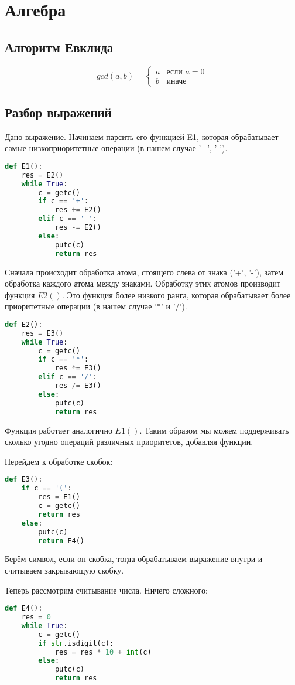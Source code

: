 \chapter{Алгебра}
\section{Алгоритм Евклида}
\[
	gcd(a, b) = 
		\begin{cases}
			a &\text{если } a = 0 \\
			b & \text{иначе}
		\end{cases}
\]

\section{Разбор выражений}
Дано выражение. Начинаем парсить его функцией E1, которая обрабатывает самые низкоприоритетные операции (в нашем случае '+', '-').
\begin{lstlisting}[language=Python]
def E1():
	res = E2()
	while True:
		c = getc()
		if c == '+':
			res += E2()
		elif c == '-':
			res -= E2()
		else:
			putc(c)
			return res
\end{lstlisting}
Сначала происходит обработка атома, стоящего слева от знака ('+', '-'), затем обработка каждого атома между знаками. Обработку этих атомов производит функция $E2()$. Это функция более низкого ранга, которая обрабатывает более приоритетные операции (в нашем случае '*' и '/').
\begin{lstlisting}[language=Python]
def E2():
	res = E3()
	while True:
		c = getc()
		if c == '*':
			res *= E3()
		elif c == '/':
			res /= E3()
		else:
			putc(c)
			return res
\end{lstlisting}
Функция работает аналогично $E1()$. Таким образом мы можем поддерживать сколько угодно операций различных приоритетов, добавляя функции.

Перейдем к обработке скобок:
\begin{lstlisting}[language=Python]
def E3():
	if c == '(':
		res = E1()
		c = getc()
		return res
	else:
		putc(c)
		return E4()
\end{lstlisting}
Берём символ, если он скобка, тогда обрабатываем выражение внутри и считываем закрывающую скобку.

Теперь рассмотрим считывание числа. Ничего сложного:
\begin{lstlisting}[language=Python]
def E4():
	res = 0
	while True:
		c = getc()
		if str.isdigit(c):
			res = res * 10 + int(c)
		else:
			putc(c)
			return res
\end{lstlisting}
